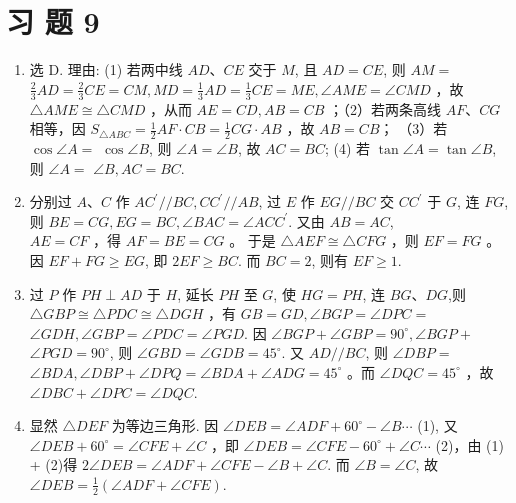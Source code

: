 \documentclass[10pt]{article}
\begin{document}
\section*{习 题 9}
\begin{enumerate}
  \item 选 D. 理由: (1) 若两中线 $A D 、 C E$ 交于 $M$, 且 $A D=C E$, 则 $A M=$ $\frac{2}{3} A D=\frac{2}{3} C E=C M, M D=\frac{1}{3} A D=\frac{1}{3} C E=M E, \angle A M E=\angle C M D$ ，故 $\triangle A M E \cong \triangle C M D$ ，从而 $A E=C D, A B=C B$ ；（2）若两条高线 $A F 、 C G$ 相等，因 $S_{\triangle A B C}=\frac{1}{2} A F \cdot C B=\frac{1}{2} C G \cdot A B$ ，故 $A B=C B ；$ （3）若 $\cos \angle A=$ $\cos \angle B$, 则 $\angle A=\angle B$, 故 $A C=B C$; (4) 若 $\tan \angle A=\tan \angle B$, 则 $\angle A=$ $\angle B, A C=B C$.
  \item 分别过 $A 、 C$ 作 $A C^{\prime} / / B C, C C^{\prime} / / A B$, 过 $E$ 作 $E G / / B C$ 交 $C C^{\prime}$ 于 $G$, 连 $F G$, 则 $B E=C G, E G=B C, \angle B A C=\angle A C C^{\prime}$. 又由 $A B=A C$,\\
$A E=C F$ ，得 $A F=B E=C G$ 。 于是 $\triangle A E F \cong \triangle C F G$ ，则 $E F=F G$ 。因 $E F+F G \geqslant E G$, 即 $2 E F \geqslant B C$. 而 $B C=2$, 则有 $E F \geqslant 1$.
  \item 过 $P$ 作 $P H \perp A D$ 于 $H$, 延长 $P H$ 至 $G$, 使 $H G=P H$, 连 $B G 、 D G$,则 $\triangle G B P \cong \triangle P D C \cong \triangle D G H$ ，有 $G B=G D, \angle B G P=\angle D P C=$ $\angle G D H, \angle G B P=\angle P D C=\angle P G D$. 因 $\angle B G P+\angle G B P=90^{\circ}, \angle B G P+$ $\angle P G D=90^{\circ}$, 则 $\angle G B D=\angle G D B=45^{\circ}$. 又 $A D / / B C$, 则 $\angle D B P=$ $\angle B D A, \angle D B P+\angle D P Q=\angle B D A+\angle A D G=45^{\circ}$ 。而 $\angle D Q C=45^{\circ}$ ，故 $\angle D B C+\angle D P C=\angle D Q C$.
  \item 显然 $\triangle D E F$ 为等边三角形. 因 $\angle D E B=\angle A D F+60^{\circ}-\angle B \cdots$ (1), 又 $\angle D E B+60^{\circ}=\angle C F E+\angle C$ ，即 $\angle D E B=\angle C F E-60^{\circ}+\angle C \cdots$ (2)，由 (1) + (2)得 $2 \angle D E B=\angle A D F+\angle C F E-\angle B+\angle C$. 而 $\angle B=\angle C$, 故 $\angle D E B=\frac{1}{2}(\angle A D F+\angle C F E)$.
\end{enumerate}
\end{document}
